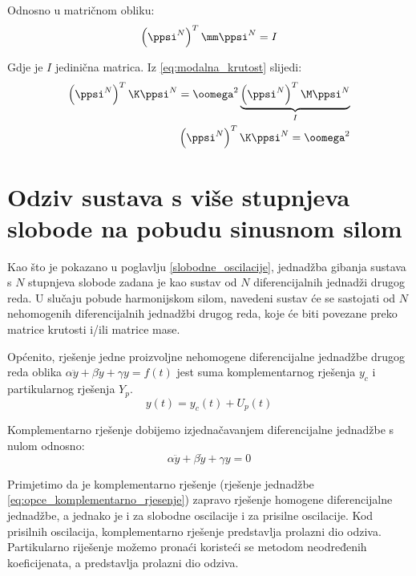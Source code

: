 Odnosno u matričnom obliku:
\begin{equation}\label{eq:relacija_normirani_matricno}
    \left(\ppsi^N\right)^T\mm\ppsi^N=I
\end{equation}

Gdje je $I$ jedinična matrica. Iz \eqref{eq:modalna_krutost} slijedi:
\begin{equation}
    \begin{split}
        \left(\ppsi^N\right)^T\K\ppsi^N=\oomega^2\underbrace{\left(\ppsi^N\right)^T\M\ppsi^N}_{\text{$I$}} \notag\\
        \left(\ppsi^N\right)^T\K\ppsi^N=\oomega^2\label{eq:normirana_krutost}
    \end{split}
\end{equation}

\section{Odziv sustava s više stupnjeva slobode na pobudu sinusnom
silom}\label{mdof_prisilne}
Kao što je pokazano u poglavlju \ref{slobodne_oscilacije}, jednadžba gibanja sustava
s $N$ stupnjeva slobode zadana je kao sustav od $N$ diferencijalnih jednadži drugog
reda. U slučaju pobude harmonijskom silom, navedeni sustav će se sastojati od $N$
nehomogenih diferencijalnih jednadžbi drugog reda, koje će biti povezane preko
matrice krutosti i/ili matrice mase. 
\par
Općenito, rješenje jedne proizvoljne nehomogene diferencijalne jednadžbe drugog reda
oblika $\alpha\ddot{y}+\beta\dot{y}+\gamma y= f(t)$ jest suma komplementarnog
rješenja $y_c$ i partikularnog rješenja $Y_p$.
\begin{equation}
    y(t)=y_c(t)+U_p(t)
\end{equation}

Komplementarno rješenje dobijemo izjednačavanjem diferencijalne jednadžbe s nulom
odnosno:
\begin{equation}\label{eq:opce_komplementarno_rjesenje}
    \alpha\ddot{y}+\beta\dot{y}+\gamma y=0
\end{equation}

Primjetimo da je komplementarno rješenje (rješenje jednadžbe \eqref{eq:opce_komplementarno_rjesenje}) 
zapravo rješenje homogene diferencijalne jednadžbe, a jednako je i za slobodne 
oscilacije i za prisilne oscilacije. Kod prisilnih oscilacija, komplementarno 
rješenje predstavlja prolazni dio odziva. Partikularno riješenje možemo pronaći 
koristeći se metodom neodređenih koeficijenata, a predstavlja prolazni dio odziva.
\par

